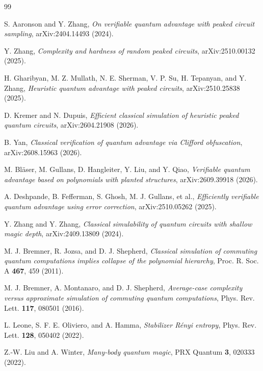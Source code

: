 \documentclass[a4paper,onecolumn,11pt,unpublished]{quantumarticle}
\theoremstyle{plain}
\theoremstyle{remark}
\begin{document}
\begin{thebibliography}{99}

 S. Aaronson and Y. Zhang, \emph{On verifiable quantum advantage with peaked circuit sampling}, arXiv:2404.14493 (2024).

 Y. Zhang, \emph{Complexity and hardness of random peaked circuits}, arXiv:2510.00132 (2025).

 H. Gharibyan, M. Z. Mullath, N. E. Sherman, V. P. Su, H. Tepanyan, and Y. Zhang, \emph{Heuristic quantum advantage with peaked circuits}, arXiv:2510.25838 (2025).

 D. Kremer and N. Dupuis, \emph{Efficient classical simulation of heuristic peaked quantum circuits}, arXiv:2604.21908 (2026).

 B. Yan, \emph{Classical verification of quantum advantage via Clifford obfuscation}, arXiv:2608.15963 (2026).

 M. Bl\"aser, M. Gullans, D. Hangleiter, Y. Liu, and Y. Qiao, \emph{Verifiable quantum advantage based on polynomials with planted structures}, arXiv:2609.39918 (2026).

 A. Deshpande, B. Fefferman, S. Ghosh, M. J. Gullans, et al., \emph{Efficiently verifiable quantum advantage using error correction}, arXiv:2510.05262 (2025). %

 Y. Zhang and Y. Zhang, \emph{Classical simulability of quantum circuits with shallow magic depth}, arXiv:2409.13809 (2024).

 M. J. Bremner, R. Jozsa, and D. J. Shepherd, \emph{Classical simulation of commuting quantum computations implies collapse of the polynomial hierarchy}, Proc. R. Soc. A \textbf{467}, 459 (2011).

 M. J. Bremner, A. Montanaro, and D. J. Shepherd, \emph{Average-case complexity versus approximate simulation of commuting quantum computations}, Phys. Rev. Lett. \textbf{117}, 080501 (2016).

 L. Leone, S. F. E. Oliviero, and A. Hamma, \emph{Stabilizer R\'enyi entropy}, Phys. Rev. Lett. \textbf{128}, 050402 (2022).

 Z.-W. Liu and A. Winter, \emph{Many-body quantum magic}, PRX Quantum \textbf{3}, 020333 (2022).


\end{thebibliography}
\end{document}
